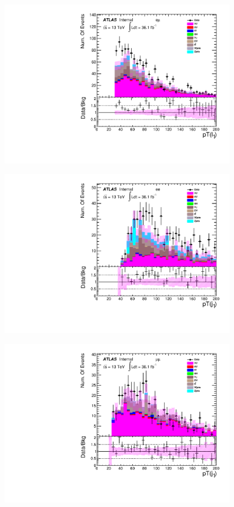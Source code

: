 \begin{figure}[h]
\begin{minipage}[t]{0.33\linewidth}
 \label{fig:nominal:pt_leadinglepton_mumu.pdf}
 \end{minipage}
\begin{minipage}[t]{0.33\linewidth}
 \centering
 \includegraphics[width=0.9\textwidth,angle=-90]{fig/nominal/pt_leadinglepton_emu.pdf}
 \label{fig:nominal:pt_leadinglepton_emu.pdf}
 \end{minipage}
\begin{minipage}[t]{0.33\linewidth}
 \centering
 \includegraphics[width=0.9\textwidth,angle=-90]{fig/nominal/pt_j1_ee.pdf}
 \label{fig:nominal:pt_j1_ee.pdf}
 \end{minipage}
\begin{minipage}[t]{0.33\linewidth}
 \centering
 \includegraphics[width=0.9\textwidth,angle=-90]{fig/nominal/pt_j1_mumu.pdf}

\end{minipage}
\end{figure}
